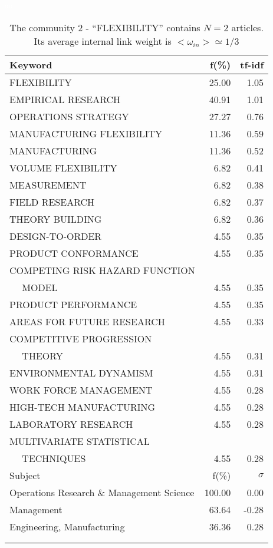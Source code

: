 \documentclass[a4paper,11pt]{report}
\begin{document}
\begin{landscape}
\clearpage

\begin{table}[!ht]
\caption{The community 2 - ``FLEXIBILITY'' contains $N = 2$ articles. Its average internal link weight is $<\omega_{in}> \simeq 1/3$ }
\textcolor{white}{aa}\\
{\scriptsize\begin{tabular}{|l r  r|}
\hline
Keyword & f(\%) & tf-idf \\
\hline
FLEXIBILITY & 25.00 & 1.05\\
EMPIRICAL RESEARCH & 40.91 & 1.01\\
OPERATIONS STRATEGY & 27.27 & 0.76\\
MANUFACTURING FLEXIBILITY & 11.36 & 0.59\\
MANUFACTURING & 11.36 & 0.52\\
VOLUME FLEXIBILITY & 6.82 & 0.41\\
MEASUREMENT & 6.82 & 0.38\\
FIELD RESEARCH & 6.82 & 0.37\\
THEORY BUILDING & 6.82 & 0.36\\
DESIGN-TO-ORDER & 4.55 & 0.35\\
PRODUCT CONFORMANCE & 4.55 & 0.35\\
COMPETING RISK HAZARD FUNCTION &  &\\
$\quad$ MODEL & 4.55 & 0.35\\
PRODUCT PERFORMANCE & 4.55 & 0.35\\
AREAS FOR FUTURE RESEARCH & 4.55 & 0.33\\
COMPETITIVE PROGRESSION &  &\\
$\quad$ THEORY & 4.55 & 0.31\\
ENVIRONMENTAL DYNAMISM & 4.55 & 0.31\\
WORK FORCE MANAGEMENT & 4.55 & 0.28\\
HIGH-TECH MANUFACTURING & 4.55 & 0.28\\
LABORATORY RESEARCH & 4.55 & 0.28\\
MULTIVARIATE STATISTICAL &  &\\
$\quad$ TECHNIQUES & 4.55 & 0.28\\
\hline
\hline
Subject & f(\%) & $\sigma$\\
\hline
Operations Research \& Management Science & 100.00 & 0.00\\
Management & 63.64 & -0.28\\
Engineering, Manufacturing & 36.36 & 0.28\\
 &  & \\
 &  & \\

\end{tabular}}
\end{table}
\end{landscape}
\end{document}
